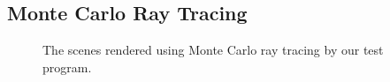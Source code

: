 \subsection{Monte Carlo Ray Tracing} 
\label{sec:mc_rt} 

\begin{figure}[htp] 
\begin{center}
    \renewcommand{\thefigure}{\thechapter.\arabic{figure}}
    \caption[]{The scenes rendered using Monte Carlo ray tracing by our test program. }
    \label{fig:rt_images} 
\end{center} 
\end{figure}


